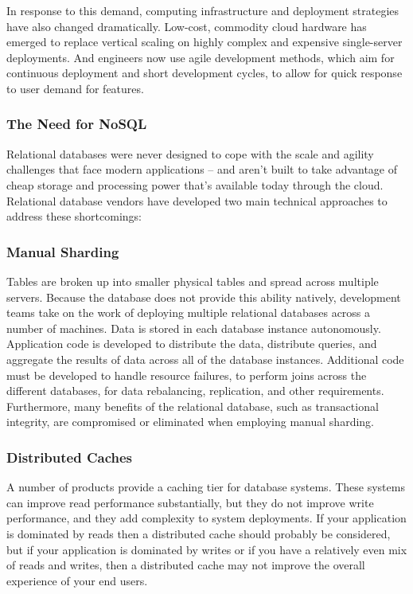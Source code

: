 \documentclass[12pt]{article}
\begin{document}
In response to this demand, computing infrastructure and deployment strategies have also changed dramatically. Low-cost, commodity cloud hardware has emerged to replace vertical scaling on highly complex and expensive single-server deployments. And engineers now use agile development methods, which aim for continuous deployment and short development cycles, to allow for quick response to user demand for features.

\subsubsection{The Need for NoSQL}

Relational databases were never designed to cope with the scale and agility challenges that face modern applications – and aren't built to take advantage of cheap storage and processing power that's available today through the cloud. Relational database vendors have developed two main technical approaches to address these shortcomings:

\subsubsection{Manual Sharding}

Tables are broken up into smaller physical tables and spread across multiple servers. Because the database does not provide this ability natively, development teams take on the work of deploying multiple relational databases across a number of machines. Data is stored in each database instance autonomously. Application code is developed to distribute the data, distribute queries, and aggregate the results of data across all of the database instances. Additional code must be developed to handle resource failures, to perform joins across the different databases, for data rebalancing, replication, and other requirements. Furthermore, many benefits of the relational database, such as transactional integrity, are compromised or eliminated when employing manual sharding.



\subsubsection{Distributed Caches}

A number of products provide a caching tier for database systems. These systems can improve read performance substantially, but they do not improve write performance, and they add complexity to system deployments. If your application is dominated by reads then a distributed cache should probably be considered, but if your application is dominated by writes or if you have a relatively even mix of reads and writes, then a distributed cache may not improve the overall experience of your end users.
\end{document}
